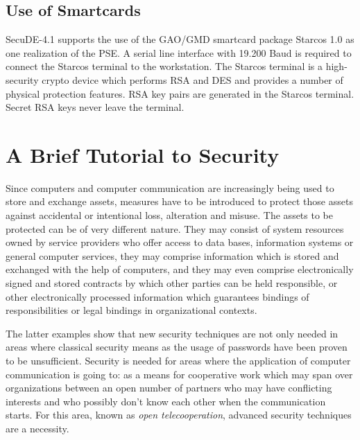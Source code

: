 \subsection{Use of Smartcards}
   SecuDE-4.1 supports the use of the GAO/GMD smartcard package Starcos 1.0 as
   one realization of the PSE. A serial line interface with 19.200 Baud is required
   to connect the Starcos terminal to the workstation. The Starcos terminal
   is a high-security crypto device which performs RSA and DES and provides a number of 
   physical protection features. RSA key pairs are generated in the Starcos terminal. 
   Secret RSA keys never leave the terminal.

\section{A Brief Tutorial to Security}
\label{tutorial}
\pagestyle{myheadings}
Since computers and computer communication are increasingly being used to store and
exchange assets, measures have to be introduced to protect those assets
against accidental or intentional loss, alteration and misuse. The assets to be protected
can be of very different nature. They may consist of system resources owned by service providers
who offer access to data bases, information systems or general computer services, they may comprise
information which is stored and exchanged with the help of computers, and they may even comprise 
electronically signed and stored contracts by which other parties can be held responsible, or
other electronically processed information which guarantees bindings of responsibilities
or legal bindings in organizational contexts. 

The latter examples show that new security techniques are not only needed in areas
where classical security means as the usage of passwords have been proven to be 
unsufficient. Security is needed for areas where the application of computer
communication is going to: as a means for cooperative work which may
span over organizations between an open number of partners who may have 
conflicting interests and who possibly don't know each other when the communication
starts. For this area, known as {\em open telecooperation}, 
advanced security techniques are a necessity. 

